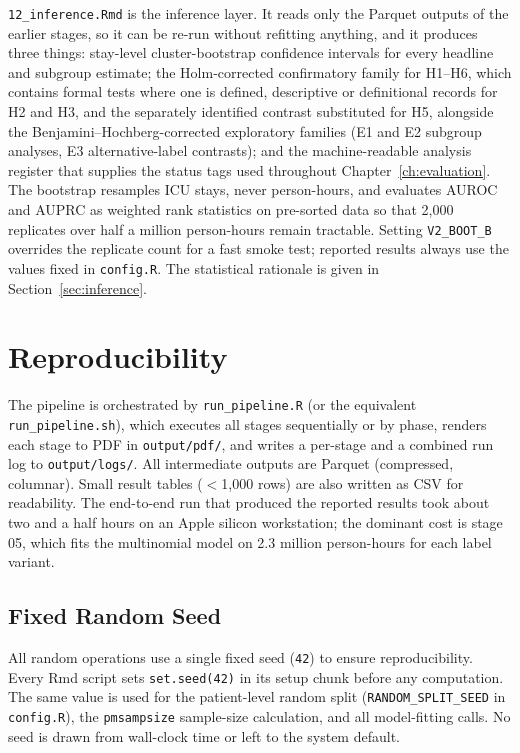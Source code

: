 \texttt{12\_inference.Rmd} is the inference layer. It reads only the Parquet
outputs of the earlier stages, so it can be re-run without refitting anything,
and it produces three things: stay-level cluster-bootstrap confidence intervals
for every headline and subgroup estimate; the Holm-corrected confirmatory family
for H1--H6, which contains formal tests where one is defined, descriptive or
definitional records for H2 and H3, and the separately identified contrast
substituted for H5, alongside the Benjamini--Hochberg-corrected exploratory
families (E1 and E2 subgroup analyses, E3 alternative-label contrasts); and the machine-readable
analysis register that supplies the status tags used
throughout Chapter~\ref{ch:evaluation}. The bootstrap resamples ICU stays, never
person-hours, and evaluates AUROC and AUPRC as weighted rank statistics on
pre-sorted data so that 2,000 replicates over half a million person-hours
remain tractable. Setting \texttt{V2\_BOOT\_B} overrides the replicate count
for a fast smoke test; reported results always use the values fixed in
\texttt{config.R}. The statistical rationale is given in
Section~\ref{sec:inference}.


\section{Reproducibility}

The pipeline is orchestrated by \texttt{run\_\allowbreak pipeline.R} (or the equivalent
\texttt{run\_\allowbreak pipeline.sh}), which executes all stages sequentially or by phase,
renders each stage to PDF in \texttt{output/pdf/}, and writes a per-stage and a
combined run log to \texttt{output/logs/}. All intermediate outputs are Parquet
(compressed, columnar). Small result tables ($<$1,000 rows) are also
written as CSV for readability. The end-to-end run that produced the reported
results took about two and a half hours on an Apple silicon workstation; the
dominant cost is stage 05, which fits the multinomial model on 2.3 million
person-hours for each label variant.

\subsection{Fixed Random Seed}

All random operations use a single fixed seed (\texttt{42}) to ensure
reproducibility. Every Rmd script sets \texttt{set.seed(42)} in its setup
chunk before any computation. The same value is used for the patient-level
random split (\texttt{RANDOM\_SPLIT\_SEED} in \texttt{config.R}), the
\texttt{pmsampsize} sample-size calculation, and all model-fitting calls. No
seed is drawn from wall-clock time or left to the system default.

